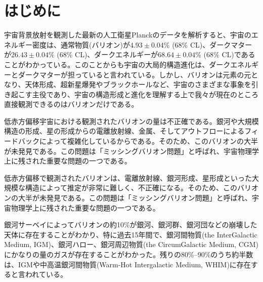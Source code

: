 \chapter{はじめに}

宇宙背景放射を観測した最新の人工衛星Planckのデータを解析すると、宇宙のエネルギー密度は、通常物質(バリオン)が$4.93\pm0.04\%$ (68\% CL)、ダークマターが$26.43\pm0.04$\% (68\% CL)、ダークエネルギーが$68.64\pm0.04$\% (68\% CL)であることがわかっている\citep{aghanim_planck_2020}。このことからも宇宙の大局的構造進化は、ダークエネルギーとダークマターが担っていると言われている。しかし、バリオンは元素の元となり、天体形成、超新星爆発やブラックホールなど、宇宙のさまざまな事象を引き起こす主役であり、宇宙の構造形成と進化を理解する上で我々が現在のところ直接観測できるのはバリオンだけである。


低赤方偏移宇宙における観測されたバリオンの量は不正確である。銀河や大規模構造の形成、星の形成からの電離放射線、金属、そしてアウトフローによるフィードバックによって複雑化しているからである\citep{shull_baryon_2012}。そのため、このバリオンの大半が未発見である。この問題は「ミッシングバリオン問題」と呼ばれ、宇宙物理学上に残された重要な問題の一つである。

低赤方偏移で観測されたバリオンは、電離放射線、銀河形成、星形成といった大規模な構造によって推定が非常に難しく、不正確になる。そのため、このバリオンの大半が未発見である。この問題は「ミッシングバリオン問題」と呼ばれ、宇宙物理学上に残された重要な問題の一つである。

銀河サーベイによってバリオンの約10\%が銀河、銀河群、銀河団などの崩壊した天体に存在することがわかり、特に過去15年間で、銀河間物質(the InterGalactic Medium, IGM)、銀河ハロー、銀河周辺物質(the CircumGalactic Medium, CGM)にかなりの量のガスが存在することがわかった。残りの80\%--90\%のうち約半数は、IGMや中高温銀河間物質(Warm-Hot Intergalactic Medium, WHIM)に存在すると言われている\citep{shull_baryon_2012,danforth_low-z_2008}。



